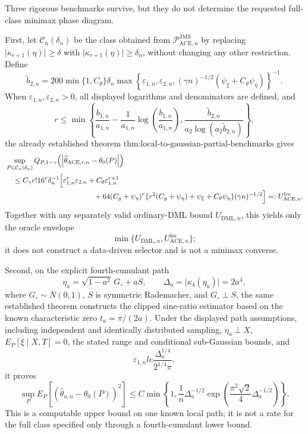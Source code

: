 Three rigorous benchmarks survive, but they do not determine the requested full-class minimax phase diagram.

First, let \(\mathcal C_n(\delta_n)\) be the class obtained from \(\mathcal P_{\mathrm{ACE},n}^{\mathrm{JMS}}\) by replacing \(\lvert\kappa_{r+1}(\eta)\rvert\ge\delta\) with \(\lvert\kappa_{r+1}(\eta)\rvert\ge\delta_n\), without changing any other restriction.  Define
\[
 \widetilde b_{2,n}
 =200\min\{1,C_{\theta}\}\delta_n
 \max\!\left\{
   \varepsilon_{1,n},\varepsilon_{2,n},
   (\gamma n)^{-1/2}(\psi_{\xi}+C_{\theta}\psi_{\eta})
 \right\}^{-1}.
\]
When \(\varepsilon_{1,n},\varepsilon_{2,n}>0\), all displayed logarithms and denominators are defined, and
\[
 r\le
 \min\!\left\{
   \frac{b_{1,n}}{a_{1,n}}
   -\frac{1}{a_{1,n}}\log\!\left(\frac{b_{1,n}}{a_{1,n}}\right),
   \frac{\widetilde b_{2,n}}{a_2\log(a_2\widetilde b_{2,n})}
 \right\},
\]
the already established theorem \(\text{thm:local-to-gaussian-partial-benchmarks}\) gives
\[
\begin{aligned}
 &\sup_{P\in\mathcal C_n(\delta_n)}
 Q_{P,1-\gamma}
 \!\left(\left|\widehat\theta_{\mathrm{ACE},r,n}-\theta_0(P)\right|\right)\\
 &\quad\le
 C_{\gamma}r!16^r\delta_n^{-1}
 \Bigl[
   \varepsilon_{1,n}^r\varepsilon_{2,n}
   +C_{\theta}\varepsilon_{1,n}^{r+1}\\
 &\hspace{42mm}
   +64(C_g+\psi_{\eta})^r
    \{r^2(C_g+\psi_{\eta})+\psi_{\xi}+C_{\theta}\psi_{\eta}\}
    (\gamma n)^{-1/2}
 \Bigr]
 =:U_{\mathrm{ACE},n}^{\mathrm{loc}}.
\end{aligned}
\]
Together with any separately valid ordinary-DML bound \(U_{\mathrm{DML},n}\), this yields only the oracle envelope
\[
 \min\{U_{\mathrm{DML},n},U_{\mathrm{ACE},n}^{\mathrm{loc}}\};
\]
it does not construct a data-driven selector and is not a minimax converse.

Second, on the explicit fourth-cumulant path
\[
 \eta_a=\sqrt{1-a^2}\,G_{\circ}+aS,
 \qquad
 \Delta_a=\lvert\kappa_4(\eta_a)\rvert=2a^4,
\]
where \(G_{\circ}\sim N(0,1)\), \(S\) is symmetric Rademacher, and \(G_{\circ}\perp S\), the same established theorem constructs the clipped sine-ratio estimator based on the known characteristic zero \(t_a=\pi/(2a)\).  Under the displayed path assumptions, including independent and identically distributed sampling, \(\eta_a\perp X\), \(E_P[\xi\mid X,T]=0\), the stated range and conditional sub-Gaussian bounds, and
\[
 \varepsilon_{1,n}le\frac{\Delta_a^{1/4}}{2^{1/4}\pi},
\]
it proves
\[
 \sup_P E_P\!\left[(\widehat\theta_{a,n}-\theta_0(P))^2\right]
 \le
 C\min\!\left\{
  1,\frac{1}{n}\Delta_a^{-1/2}
  \exp\!\left(\frac{\pi^2\sqrt2}{4}\Delta_a^{-1/2}\right)
 \right\}.
\]
This is a computable upper bound on one known local path; it is not a rate for the full class specified only through a fourth-cumulant lower bound.

